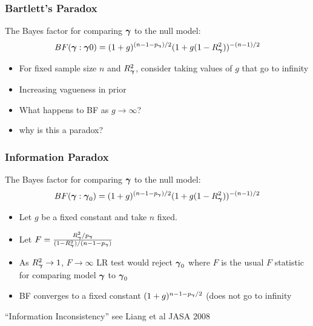 \documentclass[]{beamer}\usepackage[]{graphicx}\usepackage[]{color}
\begin{document}
\begin{frame} \frametitle{Bartlett's Paradox}


The Bayes factor for comparing $\boldsymbol{\gamma}$ to the null
model:
$$
 BF(\boldsymbol{\gamma} : \boldsymbol{\gamma}0) =    (1 + g)^{(n - 1 - p_{\boldsymbol{\gamma}})/2} (1 + g(1 - R_{\boldsymbol{\gamma}}^2))^{-(n-1)/2}
$$
\pause
\begin{itemize}
\item For fixed sample size $n$ and $R_{\boldsymbol{\gamma}}^2$, consider taking values of  $g$ that
  go to infinity  \pause
\item Increasing vagueness in prior \pause
\item What happens to BF as $g \to \infty$? \pause
\item why is this a paradox?

\end{itemize}
\end{frame}



\begin{frame}
  \frametitle{Information Paradox}

The Bayes factor for comparing $\boldsymbol{\gamma}$ to the null
model:
$$
 BF(\boldsymbol{\gamma} : \boldsymbol{\gamma}_0) =    (1 + g)^{(n - 1 - p_{\boldsymbol{\gamma}})/2} (1 + g(1 - R_{\boldsymbol{\gamma}}^2))^{-(n-1)/2}
$$
\pause
\begin{itemize}
\item Let $g$ be a fixed constant and take $n$ fixed. \pause
\item Let $F = \frac{R_{\boldsymbol{\gamma}}^2/p_{\boldsymbol{\gamma}}}{(1 - R_{\boldsymbol{\gamma}}^2)/(n - 1 - p_{\boldsymbol{\gamma}})}$ \pause
\item As $R^2_{\boldsymbol{\gamma}} \to 1$, $F \to \infty$ LR test would reject $\boldsymbol{\gamma}_0$
  where $F$ is the usual $F$ statistic for  comparing model $\boldsymbol{\gamma}$ to
  $\boldsymbol{\gamma}_0$ \pause
\item BF converges to a fixed constant $(1+g)^{n - 1 -p_{\boldsymbol{\gamma}}/2}$  (does not go
  to infinity 
\end{itemize}

``Information Inconsistency''  see Liang et al JASA 2008


\end{frame}
\end{document}
